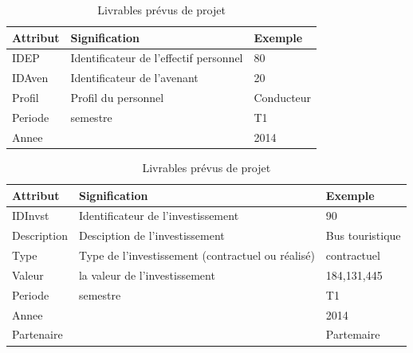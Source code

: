 \documentclass[a4paper]{report}
\begin{document}
\begin{doublespace}
	\begin{table}[H]
		\begin{center}
			\begin{tabularx}{17.5cm}{|X|X|X|}
				\hline
				\textbf{Attribut} & \textbf{Signification}                 &
				\textbf{Exemple}                                                        \\
				\hline
				IDEP              & Identificateur de l'effectif personnel & 80         \\
				\hline
				IDAven            & Identificateur de l'avenant            & 20         \\
				\hline
				Profil            & Profil du personnel                    & Conducteur \\
				\hline
				Periode           & semestre                               & T1         \\
				\hline
				Annee             &                                        & 2014       \\
				\hline
			\end{tabularx}
			\caption{Livrables prévus de projet}
		\end{center}
	\end{table}
	
	\begin{table}[H]
		\begin{center}
			\begin{tabularx}{17.5cm}{|X|X|X|}
				\hline
				\textbf{Attribut} & \textbf{Signification}                            &
				\textbf{Exemple}                                                                    \\
				\hline
				IDInvst           & Identificateur de l'investissement                & 90          \\
				\hline
				Description       & Desciption de l'investissement                    & Bus
				touristique                                                                         \\
				\hline
				Type              & Type de l'investissement (contractuel ou réalisé) &
				contractuel                                                                         \\
				\hline
				Valeur            & la valeur de l'investissement                     & 184,131,445 \\
				\hline
				Periode           & semestre                                          & T1          \\
				\hline
				Annee             &                                                   & 2014        \\
				\hline
				Partenaire        &                                                   & Partemaire  \\
				\hline
			\end{tabularx}
			\caption{Livrables prévus de projet}
		\end{center}
	\end{table}
	

\end{doublespace}
\end{document}
